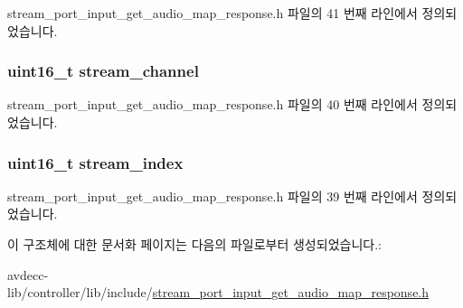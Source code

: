 stream\+\_\+port\+\_\+input\+\_\+get\+\_\+audio\+\_\+map\+\_\+response.\+h 파일의 41 번째 라인에서 정의되었습니다.

\subsubsection[{\texorpdfstring{stream\+\_\+channel}{stream_channel}}]{\setlength{\rightskip}{0pt plus 5cm}uint16\+\_\+t stream\+\_\+channel}\hypertarget{structavdecc__lib_1_1stream__port__input__audio__mapping_a99de82258f8163098a8ff558abf07af7}{}\label{structavdecc__lib_1_1stream__port__input__audio__mapping_a99de82258f8163098a8ff558abf07af7}


stream\+\_\+port\+\_\+input\+\_\+get\+\_\+audio\+\_\+map\+\_\+response.\+h 파일의 40 번째 라인에서 정의되었습니다.

\subsubsection[{\texorpdfstring{stream\+\_\+index}{stream_index}}]{\setlength{\rightskip}{0pt plus 5cm}uint16\+\_\+t stream\+\_\+index}\hypertarget{structavdecc__lib_1_1stream__port__input__audio__mapping_acad3919f1d34fc0ae26a5508175defb1}{}\label{structavdecc__lib_1_1stream__port__input__audio__mapping_acad3919f1d34fc0ae26a5508175defb1}


stream\+\_\+port\+\_\+input\+\_\+get\+\_\+audio\+\_\+map\+\_\+response.\+h 파일의 39 번째 라인에서 정의되었습니다.



이 구조체에 대한 문서화 페이지는 다음의 파일로부터 생성되었습니다.\+:\begin{DoxyCompactItemize}
\item 
avdecc-\/lib/controller/lib/include/\hyperlink{stream__port__input__get__audio__map__response_8h}{stream\+\_\+port\+\_\+input\+\_\+get\+\_\+audio\+\_\+map\+\_\+response.\+h}\end{DoxyCompactItemize}
